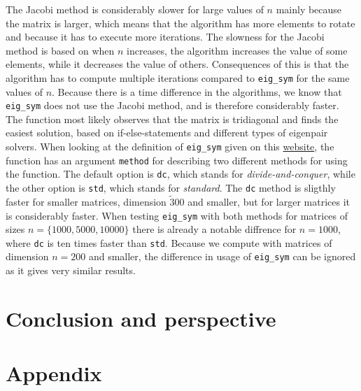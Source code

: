 \documentclass{article}
\begin{document}
  The Jacobi method is considerably slower for large values of $n$ mainly because the matrix is larger, which means that the algorithm has more elements to rotate and because it has to execute more iterations. The slowness for the Jacobi method is based on when $n$ increases, the algorithm increases the value of some elements, while it decreases the value of others. Consequences of this is that the algorithm has to compute multiple iterations compared to \texttt{eig\_sym} for the same values of $n$.
  Because there is a time difference in the algorithms, we know that \texttt{eig\_sym} does not use the Jacobi method, and is therefore considerably faster. The function most likely observes that the matrix is tridiagonal and finds the easiest solution, based on if-else-statements and different types of eigenpair solvers. When looking at the definition of \texttt{eig\_sym} given on this \href{http://arma.sourceforge.net/docs.html#eig_sym}{website}, the function has an argument \texttt{method} for describing two different methods for using the function. The default option is \texttt{dc}, which stands for \textit{divide-and-conquer}, while the other option is \texttt{std}, which stands for \textit{standard}. The \texttt{dc} method is sligthly faster for smaller matrices, dimension $\tilde 300$ and smaller, but for larger matrices it is considerably faster.
  When testing \texttt{eig\_sym} with both methods for matrices of sizes $n = \{ 1000, 5000, 10000\}$ there is already a notable diffrence for $n = 1000$, where \texttt{dc} is ten times faster than \texttt{std}. Because we compute with matrices of dimension $n = 200$ and smaller, the difference in usage of \texttt{eig\_sym} can be ignored as it gives very similar results. \\


\vspace{1cm}

\section{Conclusion and perspective} \label{sec:Conclusion}



\vspace{1cm}

\section{Appendix} \label{sec:Appendix}
\end{document}
